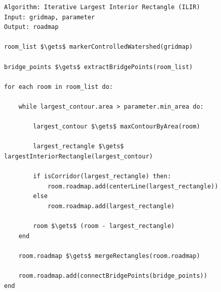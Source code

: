 \begin{lstlisting}[float=h]
Algorithm: Iterative Largest Interior Rectangle (ILIR)
Input: gridmap, parameter
Output: roadmap

room_list $\gets$ markerControlledWatershed(gridmap)

bridge_points $\gets$ extractBridgePoints(room_list)

for each room in room_list do:

    while largest_contour.area > parameter.min_area do:
    
        largest_contour $\gets$ maxContourByArea(room)
            
        largest_rectangle $\gets$ largestInteriorRectangle(largest_contour)

        if isCorridor(largest_rectangle) then:
            room.roadmap.add(centerLine(largest_rectangle))
        else
            room.roadmap.add(largest_rectangle)

        room $\gets$ (room - largest_rectangle)
    end

    room.roadmap $\gets$ mergeRectangles(room.roadmap)
    
    room.roadmap.add(connectBridgePoints(bridge_points))
end
\end{lstlisting}

